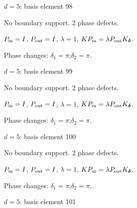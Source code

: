 \vfill
{\footnotesize\texttt{}}
\newpage
{}
{\Large $d=5$: basis element 98}\par
No boundary support. 2 phase defects.
\begin{center}
\end{center}
\vspace{-1mm}
$P_{\rm in}=I$, \quad $P_{\rm out}=I$, \quad $\lambda=1$, \qquad $K P_{\rm in}=\lambda P_{\rm out}K_{\boldsymbol\delta}$.
\par\smallskip\begin{minipage}{.98\linewidth}\small Phase changes: $\delta_{1}=\pi$;\quad $\delta_{2}=\pi$.\end{minipage}
\vfill
{\footnotesize\texttt{}}
\newpage
{}
{\Large $d=5$: basis element 99}\par
No boundary support. 2 phase defects.
\begin{center}
\end{center}
\vspace{-1mm}
$P_{\rm in}=I$, \quad $P_{\rm out}=I$, \quad $\lambda=1$, \qquad $K P_{\rm in}=\lambda P_{\rm out}K_{\boldsymbol\delta}$.
\par\smallskip\begin{minipage}{.98\linewidth}\small Phase changes: $\delta_{1}=\pi$;\quad $\delta_{2}=\pi$.\end{minipage}
\vfill
{\footnotesize\texttt{}}
\newpage
{}
{\Large $d=5$: basis element 100}\par
No boundary support. 2 phase defects.
\begin{center}
\end{center}
\vspace{-1mm}
$P_{\rm in}=I$, \quad $P_{\rm out}=I$, \quad $\lambda=1$, \qquad $K P_{\rm in}=\lambda P_{\rm out}K_{\boldsymbol\delta}$.
\par\smallskip\begin{minipage}{.98\linewidth}\small Phase changes: $\delta_{1}=\pi$;\quad $\delta_{2}=\pi$.\end{minipage}
\vfill
{\footnotesize\texttt{}}
\newpage
{}
{\Large $d=5$: basis element 101}\par
